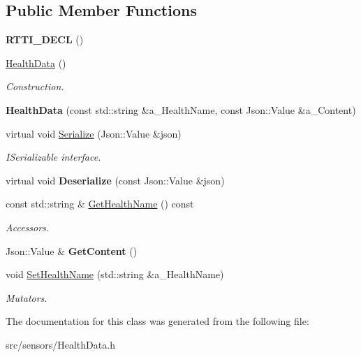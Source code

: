 \subsection*{Public Member Functions}
\begin{DoxyCompactItemize}
\item 
\mbox{\label{class_health_data_a8603be88d14a363e242f3e928904b24f}} 
{\bfseries R\+T\+T\+I\+\_\+\+D\+E\+CL} ()
\item 
\mbox{\label{class_health_data_aa2fee07f3c28c82e15883c26318e58f8}} 
\hyperlink{class_health_data_aa2fee07f3c28c82e15883c26318e58f8}{Health\+Data} ()
\begin{DoxyCompactList}\small\item\em Construction. \end{DoxyCompactList}\item 
\mbox{\label{class_health_data_a1d8441cc9f8d1cb3d37f9780e6555279}} 
{\bfseries Health\+Data} (const std\+::string \&a\+\_\+\+Health\+Name, const Json\+::\+Value \&a\+\_\+\+Content)
\item 
\mbox{\label{class_health_data_aee1ff2c272fda57592f1538c757d06ea}} 
virtual void \hyperlink{class_health_data_aee1ff2c272fda57592f1538c757d06ea}{Serialize} (Json\+::\+Value \&json)
\begin{DoxyCompactList}\small\item\em I\+Serializable interface. \end{DoxyCompactList}\item 
\mbox{\label{class_health_data_afc0d05fee8f52e4d105c7b41f0f8e20f}} 
virtual void {\bfseries Deserialize} (const Json\+::\+Value \&json)
\item 
\mbox{\label{class_health_data_ab306056294a5d1adf96dadcebb4a3134}} 
const std\+::string \& \hyperlink{class_health_data_ab306056294a5d1adf96dadcebb4a3134}{Get\+Health\+Name} () const
\begin{DoxyCompactList}\small\item\em Accessors. \end{DoxyCompactList}\item 
\mbox{\label{class_health_data_ab6b169c5eb4540c1f963614a8a39d193}} 
Json\+::\+Value \& {\bfseries Get\+Content} ()
\item 
\mbox{\label{class_health_data_ae28c98f064c7f49e351617efb5e5a6bc}} 
void \hyperlink{class_health_data_ae28c98f064c7f49e351617efb5e5a6bc}{Set\+Health\+Name} (std\+::string \&a\+\_\+\+Health\+Name)
\begin{DoxyCompactList}\small\item\em Mutators. \end{DoxyCompactList}\end{DoxyCompactItemize}


The documentation for this class was generated from the following file\+:\begin{DoxyCompactItemize}
\item 
src/sensors/Health\+Data.\+h\end{DoxyCompactItemize}
